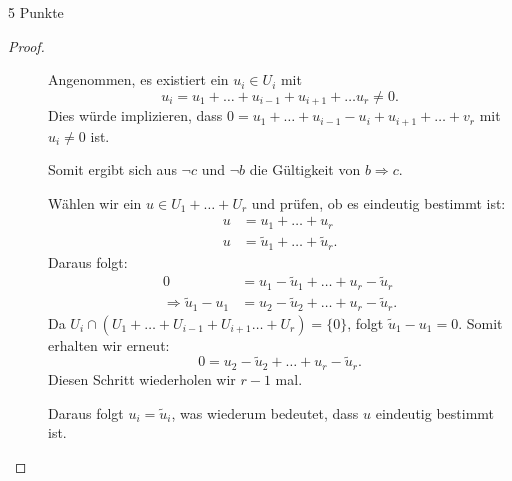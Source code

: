 \documentclass{problemset}
\begin{document}
\begin{problem}{5 Punkte}
\begin{proof}
\begin{enumerate}
\begin{description}
                  \item[]

                        Angenommen, es existiert ein $u_i \in U_i$ mit
                        \[
                            u_i = u_1 + \ldots + u_{i-1} + u_{i+1} + \ldots u_r \neq 0.
                        \]
                        Dies würde implizieren, dass $0 = u_1 + \ldots +
                        u_{i-1} - u_i + u_{i+1} + \ldots + v_r$ mit $u_i \neq
                        0$ ist.

                        Somit ergibt sich aus $\neg c$ und $\neg b$ die
                        Gültigkeit von $b \Rightarrow c$.

                  \item[]

                        Wählen wir ein $u \in U_1 + \ldots + U_r$ und prüfen,
                        ob es eindeutig bestimmt ist:
                        \begin{align*}
                            u & = u_1 + \ldots + u_r                  \\
                            u & = \tilde{u}_1 + \ldots + \tilde{u}_r.
                        \end{align*}
                        Daraus folgt:
                        \begin{align*}
                            0                             & = u_1 - \tilde{u}_1 + \ldots + u_r - \tilde{u}_r  \\
                            \Rightarrow \tilde{u}_1 - u_1 & = u_2 - \tilde{u}_2 + \ldots + u_r - \tilde{u}_r.
                        \end{align*}
                        Da $U_i \cap (U_1 + \ldots + U_{i-1} + U_{i+1} \ldots + U_r) = \{0\}$, folgt $\tilde{u}_1 - u_1 = 0$.
                        Somit erhalten wir erneut:
                        \[
                            0 = u_2 - \tilde{u}_2 + \ldots + u_r - \tilde{u}_r.
                        \]
                        Diesen Schritt wiederholen wir $r-1$ mal.

                        Daraus folgt $u_i = \tilde{u}_i$, was wiederum
                        bedeutet, dass $u$ eindeutig bestimmt ist. \checkmark
              \end{description}
    \end{enumerate}
\end{proof}
\end{problem}
\end{document}
